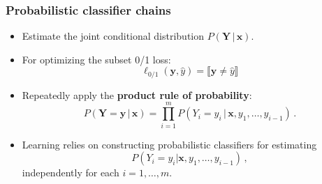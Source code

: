 \documentclass[]{beamer}
\renewcommand{\Pr}{P}
\renewcommand{\vec}[1]{\boldsymbol{#1}}
\newcommand{\given}{\, | \,}
\newcommand{\bx}{\boldsymbol{x}}
\newcommand{\by}{\boldsymbol{y}}
\newcommand{\bz}{\boldsymbol{z}}
\newcommand{\assert}[1]{\llbracket #1 \rrbracket}
\renewcommand{\emph}[1]{\textbf{\color{putblue}#1}}
\begin{document}


\begin{frame}
\frametitle{Probabilistic classifier chains}

\begin{itemize}
\item Estimate the {joint} conditional distribution $\Pr(\vec{Y} \given  \vec{x})$. 
\item For optimizing the subset 0/1 loss:  $$ \ell_{0/1}(\by, \hat{y}) = \assert{\by \ne \hat{y}}$$
\item Repeatedly apply the \emph{product rule of probability}:
$$
\Pr(\vec{Y} = \vec{y} \given \vec{x}) = \prod_{i=1}^{m} \Pr(Y_i = y_i \given \vec{x}, y_1, \ldots,y_{i-1}) \, .
$$
\item  Learning relies on constructing probabilistic classifiers for estimating 
$$
\Pr(Y_i = y_i|\vec{x}, y_1, \ldots,y_{i-1}) \,,
$$
{independently} for each $i = 1, \ldots, m$. 
\end{itemize}
\end{frame}
\end{document}
